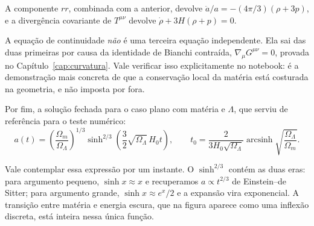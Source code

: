 A componente $rr$, combinada com a anterior, devolve
$\ddot a/a = -(4\pi/3)(\rho + 3p)$, e a divergência covariante de $T^{\mu\nu}$
devolve $\dot\rho + 3H(\rho + p) = 0$.

\begin{central}
A equação de continuidade \emph{não} é uma terceira equação independente.
Ela sai das duas primeiras por causa da identidade de Bianchi contraída,
$\nabla_{\mu}G^{\mu\nu} = 0$, provada no Capítulo~\ref{cap:curvatura}. Vale
verificar isso explicitamente no notebook: é a demonstração mais concreta de
que a conservação local da matéria está costurada na geometria, e não
imposta por fora.
\end{central}

Por fim, a solução fechada para o caso plano com matéria e $\Lambda$, que
serviu de referência para o teste numérico:
\begin{equation}
  a(t) = \left(\frac{\Omega_{m}}{\Omega_{\Lambda}}\right)^{1/3}
         \sinh^{2/3}\!\left(\frac{3}{2}\sqrt{\Omega_{\Lambda}}\,H_{0}t\right),
  \qquad
  t_{0} = \frac{2}{3H_{0}\sqrt{\Omega_{\Lambda}}}
          \operatorname{arcsinh}\sqrt{\frac{\Omega_{\Lambda}}{\Omega_{m}}}.
  \label{eq:cap13-sinh}
\end{equation}

Vale contemplar essa expressão por um instante. O $\sinh^{2/3}$ contém as
duas eras: para argumento pequeno, $\sinh x \approx x$ e recuperamos
$a \propto t^{2/3}$ de Einstein--de Sitter; para argumento grande,
$\sinh x \approx e^{x}/2$ e a expansão vira exponencial. A transição entre
matéria e energia escura, que na figura aparece como uma inflexão discreta,
está inteira nessa única função.

